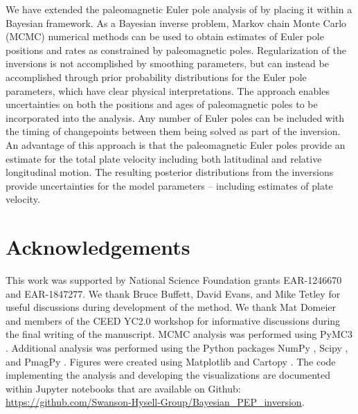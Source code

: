 \documentclass[11pt,letterpaper]{article}
\begin{document}
We have extended the paleomagnetic Euler pole analysis of \cite{Gordon1984a} by placing it within a Bayesian framework. As a Bayesian inverse problem, Markov chain Monte Carlo (MCMC) numerical methods can be used to obtain estimates of Euler pole positions and rates as constrained by paleomagnetic poles. Regularization of the inversions is not accomplished by smoothing parameters, but can instead be accomplished through prior probability distributions for the Euler pole parameters, which have clear physical interpretations. The approach enables uncertainties on both the positions and ages of paleomagnetic poles to be incorporated into the analysis. Any number of Euler poles can be included with the timing of changepoints between them being solved as part of the inversion. An advantage of this approach is that the paleomagnetic Euler poles provide an estimate for the total plate velocity including both latitudinal and relative longitudinal motion. The resulting posterior distributions from the inversions provide uncertainties for the model parameters -- including estimates of plate velocity. 

   

\section*{Acknowledgements}
\label{sec:acknowledgements}
This work was supported by National Science Foundation grants EAR-1246670 and EAR-1847277. We thank Bruce Buffett, David Evans, and Mike Tetley for useful discussions during development of the method. We thank Mat Domeier and members of the CEED YC2.0 workshop for informative discussions during the final writing of the manuscript. MCMC analysis was performed using PyMC3 \citep{Salvatier2016a}. Additional analysis was performed using the Python packages NumPy \citep{Harris2020a}, Scipy \citep{Virtanen2020a}, and PmagPy \citep{Tauxe2016a}. Figures were created using Matplotlib \citep{Hunter2007a} and Cartopy \citep{Met-Office2010a}. The code implementing the analysis and developing the visualizations are documented within Jupyter notebooks \citep{Kluyver2016a} that are available on Github: \url{https://github.com/Swanson-Hysell-Group/Bayesian_PEP_inversion}.

\footnotesize

\singlespacing



\end{document}
